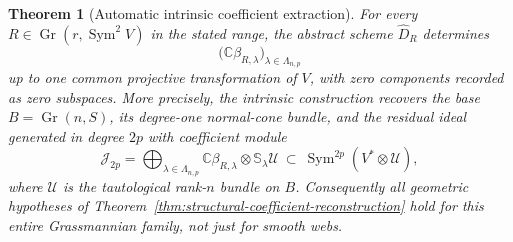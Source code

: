 \documentclass[11pt,reqno]{amsart}
\numberwithin{equation}{section}
\newtheorem{theorem}{Theorem}[section]
\theoremstyle{definition}\newtheorem{definition}[theorem]{Definition}
\theoremstyle{remark}\newtheorem{remark}[theorem]{Remark}
\newcommand{\C}{\mathbb C}\newcommand{\Q}{\mathbb Q}
\DeclareMathOperator{\Sym}{Sym}\DeclareMathOperator{\Gr}{Gr}
\begin{document}
\begin{theorem}[Automatic intrinsic coefficient extraction]
\label{thm:automatic-quadratic-coefficients}
For every \(R\in\Gr(r,\Sym^2V)\) in the stated range, the
abstract scheme \(\widehat D_R\) determines
\[
       \bigl(\C\beta_{R,\lambda}\bigr)_{\lambda\in\Lambda_{n,p}}
\]
up to one common projective transformation of \(V\), with zero
components recorded as zero subspaces.  More precisely, the intrinsic
construction recovers the base \(B=\Gr(n,S)\), its degree-one
normal-cone bundle, and the residual ideal generated in degree \(2p\)
with coefficient module
\begin{equation}\label{eq:automatic-residual-module}
 \mathcal J_{2p}=
 \bigoplus_{\lambda\in\Lambda_{n,p}}
       \C\beta_{R,\lambda}\otimes\mathbb S_\lambda\mathcal U
 \ \subset\ \Sym^{2p}(V^*\otimes\mathcal U),
\end{equation}
where \(\mathcal U\) is the tautological rank-\(n\) bundle on
\(B\).  Consequently all geometric hypotheses of
Theorem~\ref{thm:structural-coefficient-reconstruction} hold for this
entire Grassmannian family, not just for smooth webs.
\end{theorem}
\end{document}
